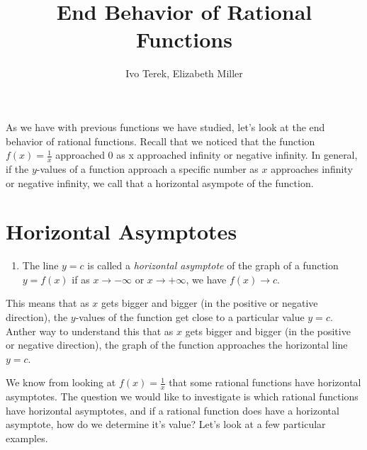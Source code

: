 \documentclass{ximera}
\author{Ivo Terek, Elizabeth Miller}
\title{End Behavior of Rational Functions}
\begin{document}
\licenseSZ
\begin{abstract}
\end{abstract}
\maketitle

As we have with previous functions we have studied, let's look at the end behavior of rational functions.  Recall that we noticed that the function $f(x)=\frac{1}{x}$ approached 0 as x approached infinity or negative infinity.  In general, if the $y$-values of a function approach a specific number as $x$ approaches infinity or negative infinity, we call that a horizontal asympote of the function.

\section{Horizontal Asymptotes}

\begin{definition}
  \mbox{}
  \begin{enumerate}
  \item The line $y=c$ is called a \emph{horizontal asymptote} of the graph of a function $y=f(x)$ if as $x \to -\infty$ or $x \to +\infty$, we have $f(x) \to c$.
  \end{enumerate}
\end{definition}

This means that as $x$ gets bigger and bigger (in the positive or negative direction), the $y$-values of the function get close to a particular value $y=c$.   Anther way to understand this that as $x$ gets bigger and bigger (in the positive or negative direction), the graph of the function approaches the horizontal line $y=c$.  

We know from looking at $f(x)=\frac{1}{x}$ that some rational functions have horizontal asymptotes.  The question we would like to investigate is which rational functions have horizontal asymptotes, and if a rational function does have a horizontal asymptote, how do we determine it's value?  Let's look at a few particular examples.
\end{document}
